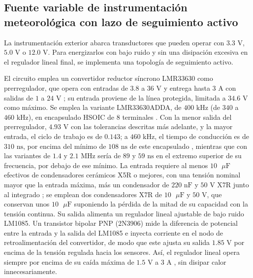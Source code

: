 \documentclass[../../General.tex]{subfiles}
\begin{document}


\subsection{Fuente variable de instrumentación meteorológica con lazo de seguimiento activo}

La instrumentación exterior abarca transductores que pueden operar con $3.3\text{ V}$, $5.0\text{ V}$ o $12.0\text{ V}$. Para energizarlos con bajo ruido y sin una disipación excesiva en el regulador lineal final, se implementa una topología de seguimiento activo.

El circuito emplea un convertidor reductor síncrono LMR33630 como prerregulador, que opera con entradas de $3.8$ a $36\text{ V}$ y entrega hasta $3\text{ A}$ con salidas de $1$ a $24\text{ V}$ \citep{ti_lmr33630}; su entrada proviene de la línea protegida, limitada a $34.6\text{ V}$ como máximo. Se emplea la variante LMR33630ADDA, de $400\text{ kHz}$ (de $340$ a $460\text{ kHz}$), en encapsulado HSOIC de $8$ terminales \citep{ti_lmr33630}. Con la menor salida del prerregulador, $4.93\text{ V}$ con las tolerancias descritas más adelante, y la mayor entrada, el ciclo de trabajo es de $0.143$; a $460\text{ kHz}$, el tiempo de conducción es de $310\text{ ns}$, por encima del mínimo de $108\text{ ns}$ de este encapsulado \citep{ti_lmr33630}, mientras que con las variantes de $1.4$ y $2.1\text{ MHz}$ sería de $89$ y $59\text{ ns}$ en el extremo superior de su frecuencia, por debajo de ese mínimo. La entrada requiere al menos $10\text{ }\mu\text{F}$ efectivos de condensadores cerámicos X5R o mejores, con una tensión nominal mayor que la entrada máxima, más un condensador de $220\text{ nF}$ y $50\text{ V}$ X7R junto al integrado \citep{ti_lmr33630}; se emplean dos condensadores X7R de $10\text{ }\mu\text{F}$ y $50\text{ V}$, que conservan unos $10\text{ }\mu\text{F}$ suponiendo la pérdida de la mitad de su capacidad con la tensión continua. Su salida alimenta un regulador lineal ajustable de bajo ruido LM1085. Un transistor bipolar PNP (2N3906) mide la diferencia de potencial entre la entrada y la salida del LM1085 e inyecta corriente en el nodo de retroalimentación del convertidor, de modo que este ajusta su salida $1.85\text{ V}$ por encima de la tensión regulada hacia los sensores. Así, el regulador lineal opera siempre por encima de su caída máxima de $1.5\text{ V}$ a $3\text{ A}$ \citep{ti_lm1085}, sin disipar calor innecesariamente.
\end{document}
